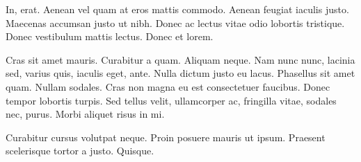 \documentclass[a4paper]{article}
\begin{document}
In, erat. Aenean vel quam at eros mattis commodo. Aenean feugiat iaculis justo.
Maecenas accumsan justo ut nibh. Donec ac lectus vitae odio lobortis tristique.
Donec vestibulum mattis lectus. Donec et lorem.

Cras sit amet mauris. Curabitur a quam. Aliquam neque. Nam nunc nunc, lacinia
sed, varius quis, iaculis eget, ante. Nulla dictum justo eu lacus. Phasellus sit
amet quam. Nullam sodales. Cras non magna eu est consectetuer faucibus. Donec
tempor lobortis turpis. Sed tellus velit, ullamcorper ac, fringilla vitae,
sodales nec, purus. Morbi aliquet risus in mi.

Curabitur cursus volutpat neque. Proin posuere mauris ut ipsum. Praesent
scelerisque tortor a justo. Quisque.

%
%



% 

%

\end{document}
